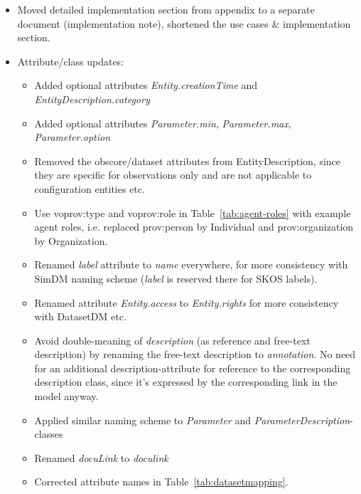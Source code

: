 \documentclass[11pt,a4paper]{ivoa}
\begin{document}
\begin{appendices}
\begin{itemize}
\item Moved detailed implementation section from appendix to a separate document (implementation note), shortened the use cases \& implementation section.
\item Attribute/class updates:
\begin{itemize}
    \item Added optional attributes \emph{Entity.creationTime} and \emph{EntityDescription.category}
    \item Added optional attributes \emph{Parameter.min},  \emph{Parameter.max},  \emph{Parameter.option}
    \item Removed the obscore/dataset attributes from EntityDescription, since they are specific for observations only and are not applicable to configuration entities etc.
    \item Use voprov:type and voprov:role in Table~\ref{tab:agent-roles} with example agent roles, i.e. replaced prov:person by Individual and prov:organization by Organization.
    \item Renamed \emph{label} attribute to \emph{name} everywhere, for more consistency with SimDM naming scheme (\emph{label} is reserved there for SKOS labels).
    \item Renamed attribute \emph{Entity.access} to \emph{Entity.rights} for more consistency with DatasetDM etc.
    \item Avoid double-meaning of \emph{description} (as reference and free-text description) by renaming the free-text description to \emph{annotation}. No need for an additional description-attribute for reference to the corresponding description class, since it's expressed by the corresponding link in the model anyway.
    \item Applied similar naming scheme to \emph{Parameter} and \emph{ParameterDescription}-classes
    \item Renamed \emph{docuLink} to \emph{doculink}
    \item Corrected attribute names in Table~\ref{tab:datasetmapping}.
\end{itemize}


\end{itemize}

\end{appendices}



\end{document}
